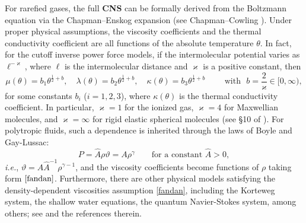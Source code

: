 \documentclass[11pt,reqno]{amsart}
\numberwithin{rk}{section}
\numberwithin{prop}{section}
\numberwithin{mydef}{section}
\numberwithin{lem}{section}
\numberwithin{equation}{section}
\numberwithin{thm}{section}
\begin{document}
For rarefied gases, the full \textbf{CNS}  can be formally derived from the Boltzmann equation 
via the Chapman--Enskog expansion (see Chapman--Cowling \cite{chap}). 
Under proper physical assumptions,  the viscosity coefficients  and the thermal conductivity coefficient  are all functions 
of the absolute temperature $\theta$. In fact,  
for the cutoff inverse power force models, if the intermolecular potential varies as $\ell^{-\varkappa}$,
where $\ell$ is the intermolecular distance and $\varkappa$ is a positive constant, then   
\begin{equation}\label{eq:1.6g}
\mu(\theta)=b_1 \theta^{\frac{1}{2}+ b},\quad \lambda(\theta)=b_2 \theta^{\frac{1}{2}+ b}, \quad  \kappa(\theta)=b_3 \theta^{\frac{1}{2}+ b}\qquad\,\, 
\text{with $\,\,b=\frac{2}{\varkappa} \in [0,\infty)$},
\end{equation}
for some constants $b_i$ ($i=1,2,3$), where $\kappa(\theta)$ is the thermal conductivity coefficient.
In particular, $\varkappa=1$ for the ionized gas, $\varkappa=4$ for Maxwellian molecules, and $\varkappa=\infty$ for rigid elastic spherical molecules (see \S 10 of \cite{chap}). For polytropic fluids, such a dependence is inherited through the laws of Boyle and Gay-Lussac{\rm:}
\begin{equation*}
P=\hat{A}\rho \vartheta=A\rho^\gamma \qquad \text{for a constant } \hat{A}>0,
\end{equation*}
\textit{i.e.}, $\vartheta=A\hat{A}^{-1}\rho^{\gamma-1}$, 
and  the viscosity coefficients become functions of $\rho$ taking form $\eqref{fandan}$.  
Furthermore, there are other physical models satisfying the density-dependent viscosities  assumption \eqref{fandan}, including the Korteweg system, the shallow water equations,  the quantum Navier-Stokes system, among others; see \cite{bd3,Dunn,gpm} and the references therein.
\end{document}
